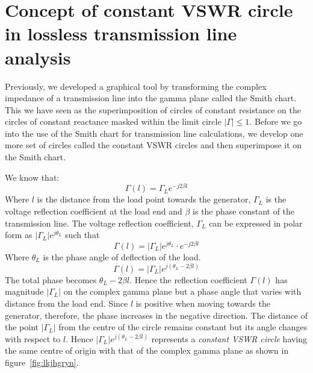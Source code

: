 \section{Concept of constant VSWR circle in lossless transmission line analysis}\label{lec:lec8}
Previously, we developed a graphical tool by transforming the complex impedance of a transmission line into the gamma plane called the Smith chart. This we have seen as the superimposition of circles of constant resistance on the circles of constant reactance masked within the limit circle $|\Gamma| \leq 1$. Before we go into the use of the Smith chart for transmission line calculations, we develop one more set of circles called the constant VSWR circles and then superimpose it on the Smith chart.

We know that:
\begin{equation*}
\Gamma(l) =\Gamma_L e^{-j2\beta{l}}
\end{equation*}
Where $l$ is the distance from the load point towards the generator, $\Gamma_{L}$ is the voltage reflection coefficient at the load end and $\beta$ is the phase constant of the transmission line. The voltage reflection coefficient, $\Gamma_L$ can be expressed in polar form as $|\Gamma_{L}|e^{j\theta_L}$ such that
\begin{equation*}
\Gamma{(l)} = |\Gamma_{L}|e^{j\theta_L}\cdot e^{-j2\beta l}
\end{equation*}
Where $\theta_L$ is the phase angle of deflection of the load.
\begin{equation}
\Gamma{(l)} =|\Gamma_L|e^{j(\theta_L - 2\beta{l})}
\end{equation}
The total phase becomes $\theta_L - 2\beta{l}$. Hence the reflection coefficient $\Gamma{(l)}$ has magnitude $|\Gamma_L|$ on the complex gamma plane but a phase angle that varies with distance from the load end. Since $l$ is positive when moving towards the generator, therefore, the phase increases in the negative direction. The distance of the point $|\Gamma_L|$ from the centre of the circle remains constant but its angle changes with respect to $l$. Hence $|\Gamma_L|e^{j(\theta_L - 2\beta l)}$ represents a \emph{constant VSWR circle} having the same centre of origin with that of the complex gamma plane as shown in figure~\ref{fig:lkjhgryn}.

